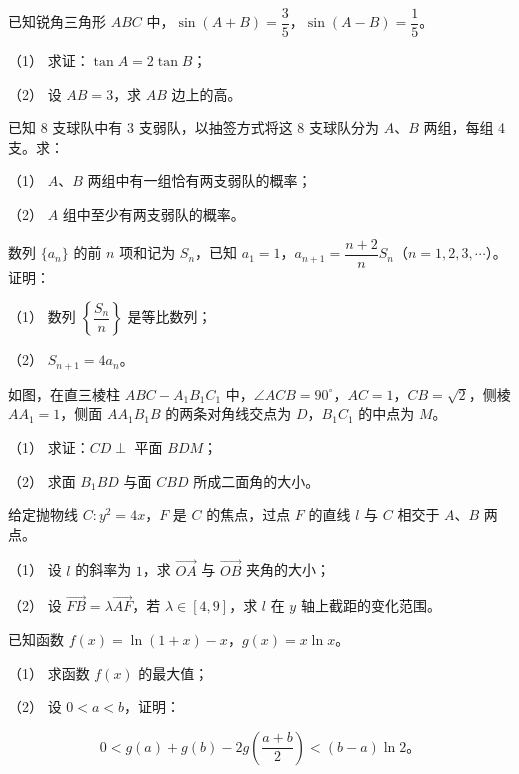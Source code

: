 \begin{question}
已知锐角三角形 $ABC$ 中，$\sin(A+B)=\dfrac35$，$\sin(A-B)=\dfrac15$。

（1） 求证：$\tan A=2\tan B$；

（2） 设 $AB=3$，求 $AB$ 边上的高。

\end{question}
\begin{question}
已知 8 支球队中有 3 支弱队，以抽签方式将这 8 支球队分为 $A\text{、}B$ 两组，每组 4 支。求：

（1） $A\text{、}B$ 两组中有一组恰有两支弱队的概率；

（2） $A$ 组中至少有两支弱队的概率。

\end{question}
\begin{question}
数列 $\{a_n\}$ 的前 $n$ 项和记为 $S_n$，已知 $a_1=1$，$a_{n+1}=\dfrac{n+2}{n}S_n$（$n=1,2,3,\cdots$）。证明：

（1） 数列 $\left\{\dfrac{S_n}{n}\right\}$ 是等比数列；

（2） $S_{n+1}=4a_n$。

\Needspace{0.4\textheight}
\end{question}
\begin{question}
如图，在直三棱柱 $ABC-A_1B_1C_1$ 中，$\angle ACB=90^\circ$，$AC=1$，$CB=\sqrt2$，侧棱 $AA_1=1$，侧面 $AA_1B_1B$ 的两条对角线交点为 $D$，$B_1C_1$ 的中点为 $M$。
\nopagebreak[4]
\begin{center}\end{center}
\nopagebreak[4]
（1） 求证：$CD\perp$ 平面 $BDM$；

（2） 求面 $B_1BD$ 与面 $CBD$ 所成二面角的大小。

\end{question}
\begin{question}
给定抛物线 $C:y^2=4x$，$F$ 是 $C$ 的焦点，过点 $F$ 的直线 $l$ 与 $C$ 相交于 $A\text{、}B$ 两点。

（1） 设 $l$ 的斜率为 $1$，求 $\overrightarrow{OA}$ 与 $\overrightarrow{OB}$ 夹角的大小；

（2） 设 $\overrightarrow{FB}=\lambda\overrightarrow{AF}$，若 $\lambda\in[4,9]$，求 $l$ 在 $y$ 轴上截距的变化范围。

\end{question}
\begin{question}
已知函数 $f(x)=\ln(1+x)-x$，$g(x)=x\ln x$。

（1） 求函数 $f(x)$ 的最大值；

（2） 设 $0<a<b$，证明：

\nopagebreak[4]
\[
0<g(a)+g(b)-2g\left(\frac{a+b}{2}\right)<(b-a)\ln2\text{。}
\]

\end{question}